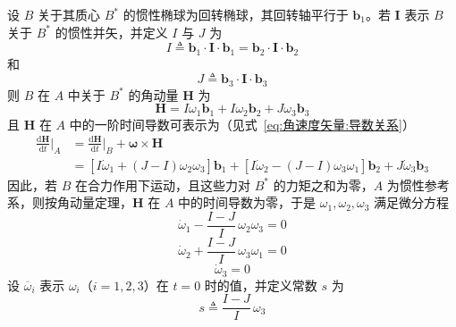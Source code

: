 \blocksep
\begin{example}
    设 $B$ 关于其质心 $B^*$ 的惯性椭球为回转椭球，其回转轴平行于 $\mathbf{b}_1$。若 $\mathbf{I}$ 表示 $B$ 关于 $B^*$ 的惯性并矢，并定义 $I$ 与 $J$ 为
    \begin{equation}
        I\triangleq\mathbf{b}_1\cdot\mathbf{I}\cdot\mathbf{b}_1=\mathbf{b}_2\cdot\mathbf{I}\cdot\mathbf{b}_2
        \label{eq:角速度欧拉:惯性矩I}
    \end{equation}
    和
    \begin{equation}
        J\triangleq\mathbf{b}_3\cdot\mathbf{I}\cdot\mathbf{b}_3
        \label{eq:角速度欧拉:惯性矩J}
    \end{equation}
    则 $B$ 在 $A$ 中关于 $B^*$ 的角动量 $\mathbf{H}$ 为
    \begin{equation}
        \mathbf{H}=I\omega_1\mathbf{b}_1+I\omega_2\mathbf{b}_2+J\omega_3\mathbf{b}_3
        \label{eq:角速度欧拉:角动量}
    \end{equation}
    且 $\mathbf{H}$ 在 $A$ 中的一阶时间导数可表示为（见式~\eqref{eq:角速度矢量:导数关系}）
    \begin{equation}
        \begin{aligned}
            \frac{\mathrm{d}\mathbf{H}}{\mathrm{d}t}\Big|_{A} &= \frac{\mathrm{d}\mathbf{H}}{\mathrm{d}t}\Big|_{B} + \bm{\omega}\times\mathbf{H}\\
            &= [I\dot{\omega}_1+(J-I)\omega_2\omega_3]\mathbf{b}_1
            + [I\dot{\omega}_2-(J-I)\omega_3\omega_1]\mathbf{b}_2
            + J\dot{\omega}_3\mathbf{b}_3
        \end{aligned}
        \label{eq:角速度欧拉:角动量导数}
    \end{equation}
    因此，若 $B$ 在合力作用下运动，且这些力对 $B^*$ 的力矩之和为零，$A$ 为惯性参考系，则按角动量定理，$\mathbf{H}$ 在 $A$ 中的时间导数为零，于是 $\omega_1,\omega_2,\omega_3$ 满足微分方程
    \begin{equation}
        \dot{\omega}_1 - \frac{I-J}{I}\,\omega_2\omega_3 = 0
    \end{equation}
    \begin{equation}
        \dot{\omega}_2 + \frac{I-J}{I}\,\omega_3\omega_1 = 0
    \end{equation}
    \begin{equation}
        \dot{\omega}_3 = 0
    \end{equation}
    设 $\overline{\omega}_i$ 表示 $\omega_i$（$i=1,2,3$）在 $t=0$ 时的值，并定义常数 $s$ 为
    \begin{equation}
        s \triangleq \frac{I-J}{I}\,\omega_3

\end{equation}
\end{example}
